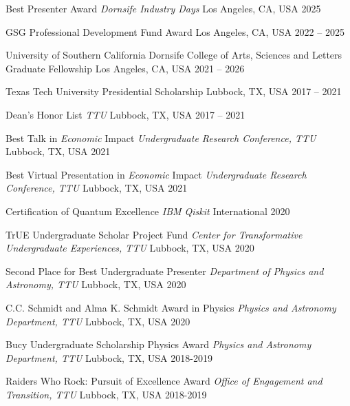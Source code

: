 

\begin{cvhonors}

    \cvhonor
    {Best Presenter Award}
    {\textit{\scriptsize Dornsife Industry Days}}
    {Los Angeles, CA, USA}
    {2025}

    \cvhonor
    {GSG Professional Development Fund Award}
    {}
    {Los Angeles, CA, USA}
    {2022 -- 2025}

    \cvhonor
    {University of Southern California Dornsife College of Arts, Sciences and Letters Graduate Fellowship}
    {}
    {Los Angeles, CA, USA}
    {2021 -- 2026}

    \cvhonor
    {Texas Tech University Presidential Scholarship}
    {}
    {Lubbock, TX, USA}
    {2017 -- 2021}

    \cvhonor
    {Dean's Honor List}
    {\textit{\scriptsize TTU}}
    {Lubbock, TX, USA}
    {2017 -- 2021}

    \cvhonor
    {Best Talk in \textit{Economic} Impact}
    {\textit{\scriptsize Undergraduate Research Conference, TTU}}
    {Lubbock, TX, USA}
    {2021}

    \cvhonor
    {Best Virtual Presentation in \textit{Economic} Impact}
    {\textit{\scriptsize Undergraduate Research Conference, TTU}}
    {Lubbock, TX, USA}
    {2021}

    \cvhonor
    {Certification of Quantum Excellence}
    {\textit{\scriptsize IBM Qiskit}}
    {International}
    {2020}

    \cvhonor
    {TrUE Undergraduate Scholar Project Fund}
    {\textit{\scriptsize Center for Transformative Undergraduate Experiences, TTU}}
    {Lubbock, TX, USA}
    {2020}

    \cvhonor
    {Second Place for Best Undergraduate Presenter}
    {\textit{\scriptsize Department of Physics and Astronomy, TTU}}
    {Lubbock, TX, USA}
    {2020}

    \cvhonor
    {C.C. Schmidt and Alma K. Schmidt Award in Physics}
    {\textit{\scriptsize Physics and Astronomy Department, TTU}}
    {Lubbock, TX, USA}
    {2020}

    \cvhonor
    {Bucy Undergraduate Scholarship Physics Award}
    {\textit{\scriptsize Physics and Astronomy Department, TTU}}
    {Lubbock, TX, USA}
    {2018-2019}

    \cvhonor
    {Raiders Who Rock:  Pursuit of Excellence Award}
    {\textit{\scriptsize Office of Engagement and Transition, TTU}}
    {Lubbock, TX, USA}
    {2018-2019}


\end{cvhonors}
